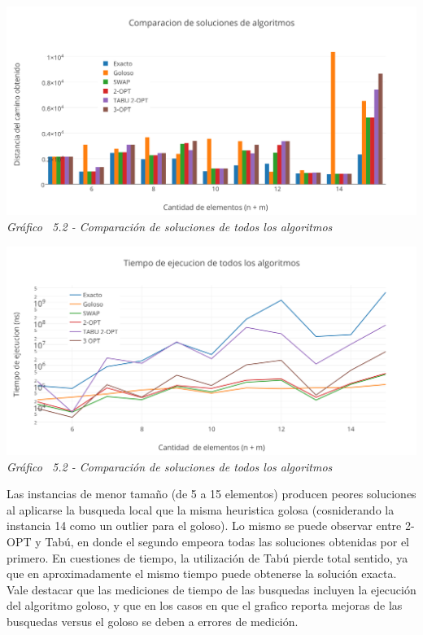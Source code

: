 \vspace*{0.3cm} \vspace*{0.3cm}
  \begin{center}
 \includegraphics[scale=0.5]{./EJ5/comparativo2.png}\\
 {\textit{Gráfico \ 5.2 - Comparaci\'on de soluciones de todos los algoritmos}}
  \end{center}
  \vspace*{0.3cm}

  
\vspace*{0.3cm} \vspace*{0.3cm}
  \begin{center}
 \includegraphics[scale=0.5]{./EJ5/medicionTodos.png}\\
 {\textit{Gráfico \ 5.2 - Comparaci\'on de soluciones de todos los algoritmos}}
  \end{center}
  \vspace*{0.3cm}

Las instancias de menor tamaño (de 5 a 15 elementos) producen peores soluciones al aplicarse la busqueda local que la misma heuristica golosa (cosniderando la instancia 14 como un outlier para el goloso). Lo mismo se puede observar entre 2-OPT y Tabú, en donde el segundo empeora todas las soluciones obtenidas por el primero. En cuestiones de tiempo, la utilización de Tabú pierde total sentido, ya que en aproximadamente el mismo tiempo puede obtenerse la solución exacta. Vale destacar que las mediciones de tiempo de las busquedas incluyen la ejecución del algoritmo goloso, y que en los casos en que el grafico reporta mejoras de las busquedas versus el goloso se deben a errores de medición.


